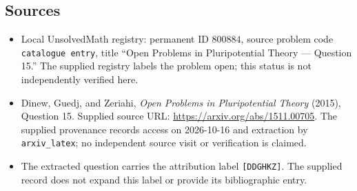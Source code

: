 \documentclass[11pt]{article}
\begin{document}
\subsection{Sources}
\begin{itemize}
\item Local UnsolvedMath registry: permanent ID $800884$, source problem code \texttt{catalogue entry}, title ``Open Problems in Pluripotential Theory --- Question 15.'' The supplied registry labels the problem open; this status is not independently verified here.
\item Dinew, Guedj, and Zeriahi, \emph{Open Problems in Pluripotential Theory} (2015), Question 15. Supplied source URL: \url{https://arxiv.org/abs/1511.00705}. The supplied provenance records access on 2026-10-16 and extraction by \texttt{arxiv\_latex}; no independent source visit or verification is claimed.
\item The extracted question carries the attribution label \texttt{[DDGHKZ]}. The supplied record does not expand this label or provide its bibliographic entry.
\end{itemize}
\end{document}
